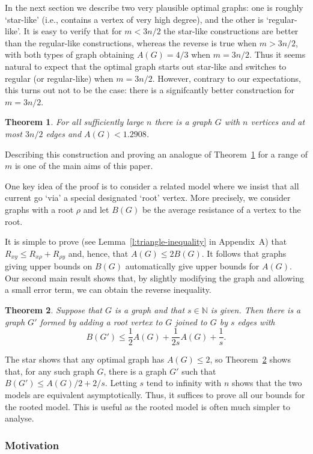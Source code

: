 \documentclass[11pt]{article}
\newtheorem{theorem}{Theorem}
\theoremstyle{remark}
\def\N{\mathbb{N}}
\begin{document}
In the next section we describe two very plausible optimal graphs: one
is roughly `star-like' (i.e., contains a vertex of very high degree),
and the other is `regular-like'. It is easy to verify that for
$m<3n/2$ the star-like constructions are better than the regular-like
constructions, whereas the reverse is true when $m>3n/2$, with both
types of graph obtaining $A(G)=4/3$ when $m=3n/2$. Thus it seems
natural to expect that the optimal graph starts out star-like and
switches to regular (or regular-like) when $m=3n/2$.  However,
contrary to our expectations, this turns out not to be the case: there
is a signifcantly better construction for $m=3n/2$.
\begin{theorem}\label{t:alpha=3}
  For all sufficiently large $n$ there is a graph $G$ with $n$
  vertices and at most $3n/2$ edges and $A(G)<1.2908$.
\end{theorem}
\noindent%
Describing this construction and proving an analogue of
Theorem~\ref{t:alpha=3} for a range of $m$ is one of the main aims of
this paper.

One key idea of the proof is to consider a related model where we 
insist that all current go `via' a special designated `root' vertex. More
precisely, we consider graphs with a root $\rho$ and let $B(G)$ be the
average resistance of a vertex to the root.

It is simple to prove (see Lemma~\ref{l:triangle-inequality} in Appendix~A) that
$R_{xy}\le R_{x\rho}+R_{\rho y}$ and, hence, that $A(G)\le 2B(G)$.
It follows that graphs giving upper bounds on $B(G)$ automatically give upper bounds
for $A(G)$. Our second main result shows that, by slightly modifying
the graph and allowing a small error term, we can obtain the reverse
inequality.
\begin{theorem}\label{root-unroot:t}
  Suppose that $G$ is a graph and that $s\in \N$ is given. Then there
  is a graph $G'$ formed by adding a root vertex to $G$ joined to $G$
  by $s$ edges with
  \[
  B(G')\le \frac12 A(G) + \frac1{2s} A(G)+\frac{1}{s}.
  \]
\end{theorem}
\noindent%
The star shows that any optimal graph has $A(G)\le 2$, so
Theorem~\ref{root-unroot:t} shows that, for any such graph $G$, there
is a graph $G'$ such that $B(G')\le A(G)/2+2/s$.  Letting $s$ tend to
infinity with $n$ shows that the two models are equivalent
asymptotically.  Thus, it suffices to prove all our bounds for the
rooted model. This is useful as the rooted model is often much simpler
to analyse.

\subsubsection*{Motivation}
\end{document}

